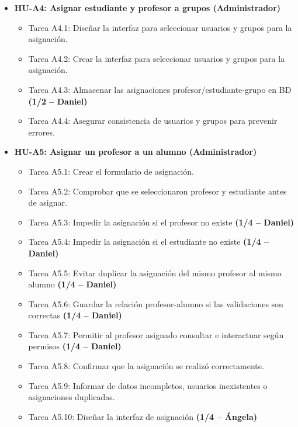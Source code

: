 \begin{itemize}[leftmargin=1.2em, itemsep=4pt]
    \item \textbf{HU-A4: Asignar estudiante y profesor a grupos (Administrador)}
    \begin{itemize}[label=$\circ$, leftmargin=1.5em, itemsep=2pt]
        \item \textsf{Tarea A4.1:} Diseñar la interfaz para seleccionar usuarios y grupos para la asignación.
        \item \textsf{Tarea A4.2:} Crear la interfaz para seleccionar usuarios y grupos para la asignación.
        \item \textsf{Tarea A4.3:} Almacenar las asignaciones profesor/estudiante-grupo en BD \hfill \textbf{(1/2 -- Daniel)}
        \item \textsf{Tarea A4.4:} Asegurar consistencia de usuarios y grupos para prevenir errores.
    \end{itemize}

    \item \textbf{HU-A5: Asignar un profesor a un alumno (Administrador)}
    \begin{itemize}[label=$\circ$, leftmargin=1.5em, itemsep=2pt]
        \item \textsf{Tarea A5.1:} Crear el formulario de asignación.
        \item \textsf{Tarea A5.2:} Comprobar que se seleccionaron profesor y estudiante antes de asignar.
        \item \textsf{Tarea A5.3:} Impedir la asignación si el profesor no existe \hfill \textbf{(1/4 -- Daniel)}
        \item \textsf{Tarea A5.4:} Impedir la asignación si el estudiante no existe \hfill \textbf{(1/4 -- Daniel)}
        \item \textsf{Tarea A5.5:} Evitar duplicar la asignación del mismo profesor al mismo alumno \hfill \textbf{(1/4 -- Daniel)}
        \item \textsf{Tarea A5.6:} Guardar la relación profesor-alumno si las validaciones son correctas \hfill \textbf{(1/4 -- Daniel)}
        \item \textsf{Tarea A5.7:} Permitir al profesor asignado consultar e interactuar según permisos \hfill \textbf{(1/4 -- Daniel)}
        \item \textsf{Tarea A5.8:} Confirmar que la asignación se realizó correctamente.
        \item \textsf{Tarea A5.9:} Informar de datos incompletos, usuarios inexistentes o asignaciones duplicadas.
        \item \textsf{Tarea A5.10:} Diseñar la interfaz de asignación \hfill \textbf{(1/4 -- Ángela)}
    \end{itemize}
\end{itemize}

